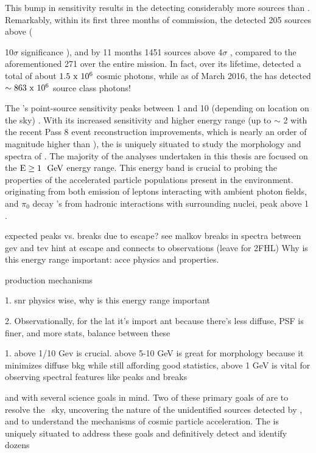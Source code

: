 This bump in sensitivity results in the \lat{} detecting considerably more sources than \egret.  Remarkably, within its first three months of commission, the \lat{} detected 205 sources above ({\rm 10$\sigma$ significance \cite{lat_3m}), and by 11 months 1451 sources above 4$\sigma$ \citep{1FGL}, compared to  the aforementioned 271 over the entire \egret{} mission. In fact, over its lifetime, \egret{} detected a total of about ${\rm 1.5~x~10^6}$ cosmic photons, while as of March 2016, the \lat{} has detected ${\rm \sim 863~x~10^6}$ source class photons! 

The \lat's point-source sensitivity peaks between 1 and 10\gev{} (depending on location on the sky) . With its increased sensitivity and higher energy range (up to $\sim$ 2\tev{} with the recent Pass 8 event reconstruction improvements, which is nearly an order of magnitude higher than \egret{}), the \lat{} is uniquely situated to study the \gam{} morphology and spectra of \snrs{}. The majority of the analyses undertaken in this thesis are focused on the ${\rm E \geq 1~~\mathrm{GeV}}$ energy range. This energy band is crucial to probing the properties of the accelerated particle populations present in the \snr{} environment. \gam{} \seds{} originating from both \ic{} emission of leptons interacting with ambient photon fields, and $\pi_0$ decay \gam's from hadronic interactions with surrounding nuclei, peak above 1\gev{} .  

expected peaks vs. breaks due to escape? see malkov
breaks in spectra between gev and tev hint at escape
\cray
and connects to \tev observations (leave for 2FHL)
Why is this energy range important:
acce
\snr{} physics and \he{} \gam{} properties. 


production mechanisms

1. snr physics wise, why is this energy range important

2. Observationally, for the lat it's import ant because there's less diffuse, PSF is finer, and more stats, balance between these
 

1. above 1/10 Gev is crucial. above 5-10 GeV is great for morphology because it minimizes diffuse bkg while still affording good statistics, above 1 GeV is vital for observing spectral features like peaks and breaks 

 and with several science goals in mind. Two of these primary goals of are to resolve the \gam~sky, uncovering the nature of the unidentified sources detected by \egret, and to understand the mechanisms of cosmic particle acceleration. The \lat is uniquely situated to address these goals and definitively detect and identify dozens \snrs


}
